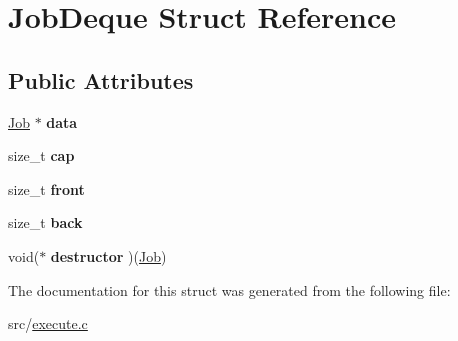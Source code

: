 \hypertarget{structJobDeque}{}\section{Job\+Deque Struct Reference}
\label{structJobDeque}
\subsection*{Public Attributes}
\begin{DoxyCompactItemize}
\item 
\hyperlink{structJob}{Job} $\ast$ {\bfseries data}\hypertarget{structJobDeque_a64ffe00e0d442ea41c3ac215ac92032c}{}\label{structJobDeque_a64ffe00e0d442ea41c3ac215ac92032c}

\item 
size\+\_\+t {\bfseries cap}\hypertarget{structJobDeque_a43fa292f87d96cef4812c02da0b4c48e}{}\label{structJobDeque_a43fa292f87d96cef4812c02da0b4c48e}

\item 
size\+\_\+t {\bfseries front}\hypertarget{structJobDeque_aa2ca9e81111f0a6d82dec29a966bc10a}{}\label{structJobDeque_aa2ca9e81111f0a6d82dec29a966bc10a}

\item 
size\+\_\+t {\bfseries back}\hypertarget{structJobDeque_a78f688a942cbea0fc033afac41273325}{}\label{structJobDeque_a78f688a942cbea0fc033afac41273325}

\item 
void($\ast$ {\bfseries destructor} )(\hyperlink{structJob}{Job})\hypertarget{structJobDeque_a040e8134c0569789fc67c4b8851a3129}{}\label{structJobDeque_a040e8134c0569789fc67c4b8851a3129}

\end{DoxyCompactItemize}


The documentation for this struct was generated from the following file\+:\begin{DoxyCompactItemize}
\item 
src/\hyperlink{execute_8c}{execute.\+c}\end{DoxyCompactItemize}
